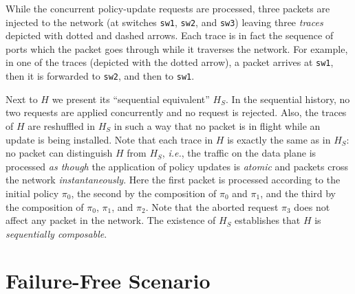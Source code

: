 \documentclass[11pt,pdftex,letter]{article}
\newcommand{\ie}{{\it i.e.}}
\begin{document}
\begin{appendix}
{While the concurrent policy-update requests are processed, three
packets are injected to the network (at switches \texttt{sw1},
\texttt{sw2}, and \texttt{sw3}) leaving three \emph{traces} depicted
with dotted and dashed arrows.
Each trace is in fact the sequence of ports which the packet goes
through while it traverses the network.
For example, in one of the traces (depicted with the dotted
arrow), a packet arrives at \texttt{sw1}, then it is forwarded to
\texttt{sw2}, and then to \texttt{sw1}.

%

Next to $H$ we present its ``sequential equivalent''
$H_S$. In the sequential history, no two requests
are applied concurrently and no request is rejected.
Also, the traces of $H$ are reshuffled in $H_S$ in such a way that no
packet is in flight while an update is being installed.
Note that each trace in $H$ is exactly the same as in $H_S$: no packet
can distinguish $H$ from $H_S$, \ie, the traffic on the data plane is
processed \emph{as though} the application of policy updates is
\emph{atomic} and packets cross the network \emph{instantaneously}.
Here the first packet is processed according to the initial policy
$\pi_0$, the second by the composition of $\pi_0$ and $\pi_1$, and
the third by the composition of $\pi_0$, $\pi_1$, and $\pi_2$.
Note that the aborted request $\pi_3$ does not affect any packet in
the network.
The existence of $H_S$ establishes that $H$ is \emph{sequentially composable}.


\section{Failure-Free Scenario}\label{ssec:bit}


}
\end{appendix}
\end{document}

